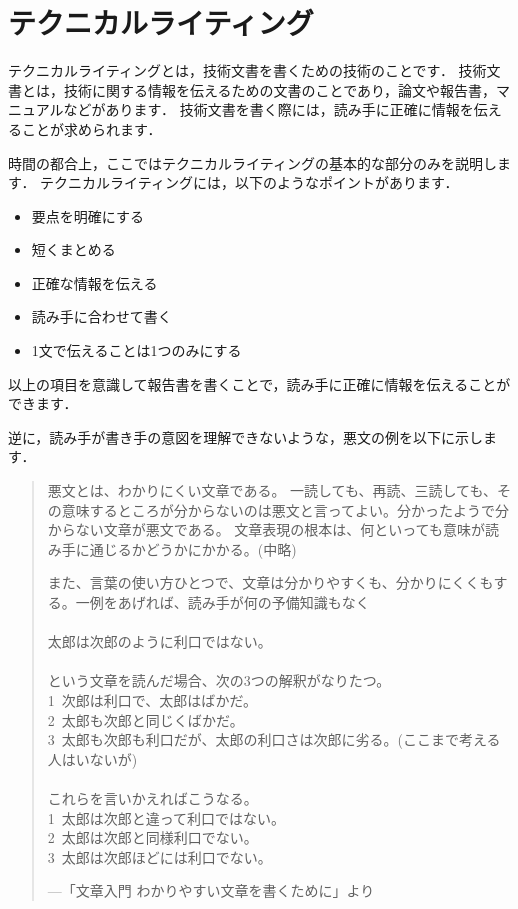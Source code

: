 \documentclass{jarticle}
\begin{document}
\section{テクニカルライティング}
テクニカルライティングとは，技術文書を書くための技術のことです．
技術文書とは，技術に関する情報を伝えるための文書のことであり，論文や報告書，マニュアルなどがあります．
技術文書を書く際には，読み手に正確に情報を伝えることが求められます．

時間の都合上，ここではテクニカルライティングの基本的な部分のみを説明します．
テクニカルライティングには，以下のようなポイントがあります．
\begin{itemize}
  \item 要点を明確にする
  \item 短くまとめる
  \item 正確な情報を伝える
  \item 読み手に合わせて書く
  \item 1文で伝えることは1つのみにする
\end{itemize}

以上の項目を意識して報告書を書くことで，読み手に正確に情報を伝えることができます．

逆に，読み手が書き手の意図を理解できないような，悪文の例を以下に示します．
\begin{quotation}
悪文とは、わかりにくい文章である。
一読しても、再読、三読しても、その意味するところが分からないのは悪文と言ってよい。分かったようで分からない文章が悪文である。
文章表現の根本は、何といっても意味が読み手に通じるかどうかにかかる。(中略)

また、言葉の使い方ひとつで、文章は分かりやすくも、分かりにくくもする。一例をあげれば、読み手が何の予備知識もなく
\\\\
太郎は次郎のように利口ではない。
\\\\
という文章を読んだ場合、次の3つの解釈がなりたつ。\\
1\ 次郎は利口で、太郎はばかだ。\\
2\ 太郎も次郎と同じくばかだ。\\
3\ 太郎も次郎も利口だが、太郎の利口さは次郎に劣る。(ここまで考える人はいないが)
\\\\
これらを言いかえればこうなる。\\
1\ 太郎は次郎と違って利口ではない。\\
2\ 太郎は次郎と同様利口でない。\\
3\ 太郎は次郎ほどには利口でない。
\begin{flushright}
  ---「文章入門 わかりやすい文章を書くために」\cite{akubun}より
\end{flushright}
\end{quotation}
\end{document}
